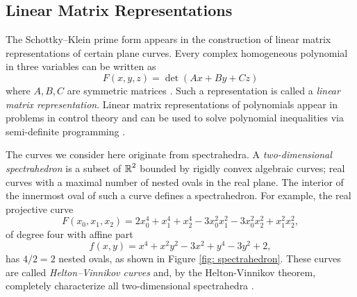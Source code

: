 
\subsection{Linear Matrix Representations}

The Schottky--Klein prime form appears in the construction of linear
matrix representations of certain plane curves. Every complex homogeneous
polynomial in three variables can be written as
\[
    F(x,y,z) = \det \left( Ax + By + Cz \right)
\]
where $A,B,C$ are symmetric matrices \cite{Quarez12}. Such a
representation is called a {\it linear matrix representation}. Linear
matrix representations of polynomials appear in problems in control
theory and can be used to solve polynomial inequalities via semi-definite
programming \cite{HeltonVinnikov07,PSV10}.

The curves we consider here originate from spectrahedra. A {\it
  two-dimensional spectrahedron} is a subset of $\operatorname{\mathbb{R}}^2$ bounded by
rigidly convex algebraic curves; real curves with a maximal number of
nested ovals in the real plane. The interior of the innermost oval of
such a curve defines a spectrahedron. For example, the real projective
curve
\[
    F(x_0,x_1,x_2) =
    2x_0^4 + x_1^4 + x_2^4 - 3x_0^2x_1^2 - 3x_0^2x_2^2 + x_1^2x_2^2,
\]
of degree four with affine part
\[
    f(x,y) = x^{4} + x^{2} y^{2} - 3 x^{2} + y^{4} - 3 y^{2} + 2,
\]
has $4/2 = 2$ nested ovals, as shown in Figure \ref{fig:
  spectrahedron}. These curves are called {\it Helton--Vinnikov curves}
and, by the Helton-Vinnikov theorem, completely characterize all
two-dimensional spectrahedra \cite{HeltonVinnikov07}.

